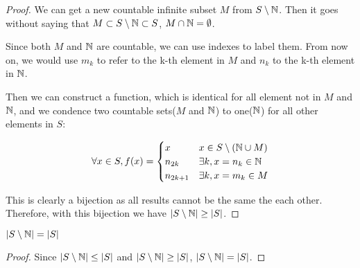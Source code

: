 \begin{proof}
    We can get a new countable infinite subset $M$ from $S \setminus \mathbb{N}$. 
    Then it goes without saying that $M \subset S \setminus \mathbb{N} \subset S$, $M \cap \mathbb{N} = \emptyset$.

    Since both $M$ and $\mathbb{N}$ are countable, we can use indexes to label them. 
    From now on, we would use $m_k$ to refer to the k-th element in $M$ and $n_k$ to the k-th element in $\mathbb{N}$.

    Then we can construct a function, which is identical for all element not in $M$ and $\mathbb{N}$, and we condence two countable sets($M$ and $\mathbb{N}$) to one($\mathbb{N}$) for all other elements in $S$:

    \begin{align*}
        \forall x \in S, f(x) = \begin{cases}
            x          & x \in S \setminus (\mathbb{N} \cup M) \\
            n_{2k}     & \exists k, x = n_k \in \mathbb{N}     \\
            n_{2k+1}   & \exists k, x = m_k \in M       
        \end{cases}
    \end{align*}

    This is clearly a bijection as all results cannot be the same the each other. 
    Therefore, with this bijection we have $|S \setminus \mathbb{N}| \ge |S|$.
\end{proof}


\begin{theorem}
    $|S \setminus \mathbb{N}| = |S|$
\end{theorem}

\begin{proof}
    Since $|S \setminus \mathbb{N}| \le |S|$ and $|S \setminus \mathbb{N}| \ge |S|$, $|S \setminus \mathbb{N}| = |S|$.
\end{proof}


